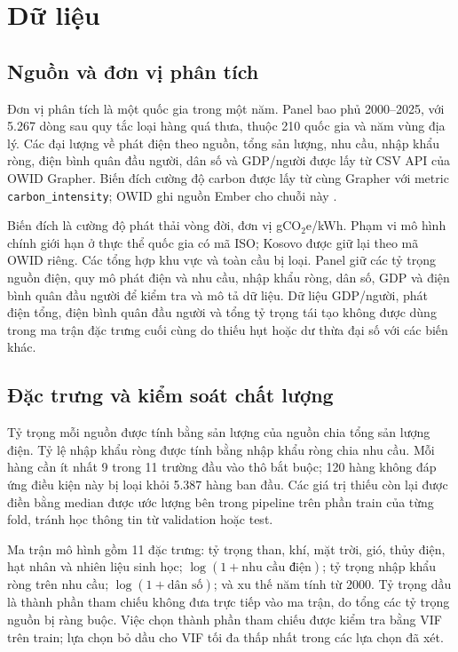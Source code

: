 \documentclass[11pt,a4paper]{article}
\begin{document}
\section{Dữ liệu}

\subsection{Nguồn và đơn vị phân tích}

Đơn vị phân tích là một quốc gia trong một năm. Panel bao phủ 2000--2025, với
5.267 dòng sau quy tắc loại hàng quá thưa, thuộc 210 quốc gia và năm vùng địa
lý. Các đại lượng về phát điện theo nguồn, tổng sản lượng, nhu cầu, nhập khẩu
ròng, điện bình quân đầu người, dân số và GDP/người được lấy từ CSV API của
OWID Grapher. Biến đích cường độ carbon được lấy từ cùng Grapher với metric
\texttt{carbon\_intensity}; OWID ghi nguồn Ember cho chuỗi này
\citep{owid_carbon,owid_electricity,ember_method}.

Biến đích là cường độ phát thải vòng đời, đơn vị
gCO$_2$e/kWh. Phạm vi mô hình chính giới hạn ở thực thể quốc gia có mã ISO;
Kosovo được giữ lại theo mã OWID riêng. Các tổng hợp khu vực và toàn cầu bị
loại. Panel giữ các tỷ trọng nguồn điện, quy mô phát điện và nhu cầu, nhập
khẩu ròng, dân số, GDP và điện bình quân đầu người để kiểm tra và mô tả dữ
liệu. Dữ liệu GDP/người, phát điện tổng, điện bình quân đầu người và tổng tỷ
trọng tái tạo không được dùng trong ma trận đặc trưng cuối cùng do thiếu hụt
hoặc dư thừa đại số với các biến khác.

\subsection{Đặc trưng và kiểm soát chất lượng}

Tỷ trọng mỗi nguồn được tính bằng sản lượng của nguồn chia tổng sản lượng
điện. Tỷ lệ nhập khẩu ròng được tính bằng nhập khẩu ròng chia nhu cầu. Mỗi hàng
cần ít nhất 9 trong 11 trường đầu vào thô bắt buộc; 120 hàng không đáp ứng
điều kiện này bị loại khỏi 5.387 hàng ban đầu. Các giá trị thiếu còn lại được
điền bằng median được ước lượng bên trong pipeline trên phần train của từng
fold, tránh học thông tin từ validation hoặc test.

Ma trận mô hình gồm 11 đặc trưng: tỷ trọng than, khí, mặt trời, gió, thủy
điện, hạt nhân và nhiên liệu sinh học; $\log(1+\text{nhu cầu điện})$;
tỷ trọng nhập khẩu ròng trên nhu cầu; $\log(1+\text{dân số})$; và xu thế năm
tính từ 2000. Tỷ trọng dầu là thành phần tham chiếu không đưa trực tiếp vào
ma trận, do tổng các tỷ trọng nguồn bị ràng buộc. Việc chọn thành phần tham
chiếu được kiểm tra bằng VIF trên train; lựa chọn bỏ dầu cho VIF tối đa thấp
nhất trong các lựa chọn đã xét.
\end{document}
